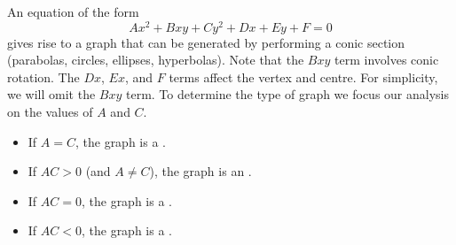 \begin{formulabox}
An equation of the form
$$Ax^2+Bxy+Cy^2+Dx+Ey+F=0$$
gives rise to a graph that can be generated by performing a conic section (parabolas, circles, ellipses, hyperbolas).
Note that the $Bxy$ term involves conic rotation. The $Dx$, $Ex$, and $F$ terms affect the vertex and centre.
For simplicity, we will omit the $Bxy$ term.
To determine the type of graph we focus our analysis on the values of $A$ and $C$.
\begin{itemize}\setlength{\itemsep}{0 in}
	\item If $A=C$, the graph is a .
	\item If $AC>0$ (and $A\neq C$), the graph is an .
	\item If $AC=0$, the graph is a .
	\item If $AC<0$, the graph is a .
\end{itemize}
\end{formulabox}

